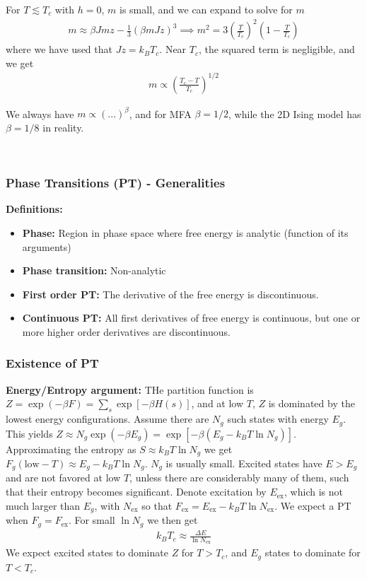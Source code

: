 \documentclass[a4paper, english, 12pt]{article}
\newcommand{\closed}[1]{\left( #1 \right)}
\begin{document}
\begin{multicols*}{2}
For $T\lesssim T_c$ with $h=0$, $m$ is small, and we can expand to solve for $m$
\begin{align*}
    m \approx \beta J m z - \frac{1}{3} (\beta m J z)^3 \implies m^2 = 3 \closed{\frac{T}{T_c}}^2 \closed{1-\frac{T}{T_c}} 
\end{align*}
where we have used that $Jz=k_B T_c$. Near $T_c$, the squared term is negligible, and we get 
\begin{align*}
    m \propto \closed{\frac{T_c-T}{T_c}}^{1/2}
\end{align*}

We always have $m\propto(...)^{\beta}$, and for MFA $\beta=1/2$, while the 2D Ising model has $\beta=1/8$ in reality. 

\


\subsubsection*{\scriptsize Phase Transitions (PT) - Generalities}
\textbf{Definitions:}
\begin{itemize}
    \item \textbf{Phase:} Region in phase space where free energy is analytic (function of its arguments)
    \item \textbf{Phase transition:} Non-analytic
    \item \textbf{First order PT:} The derivative of the free energy is discontinuous. 
    \item \textbf{Continuous PT:} All first derivatives of free energy is continuous, but one or more higher order derivatives are discontinuous. 
\end{itemize}

\subsubsection*{\tiny Existence of PT} 

\textbf{Energy/Entropy argument:} THe partition function is $Z=\exp(-\beta F)=\sum_s \exp[-\beta H(s)]$, and at low $T$, $Z$ is dominated by the lowest energy configurations. Assume there are $N_g$ such states with energy $E_g$. This yields $Z\approx N_g \exp(-\beta E_g)=\exp[-\beta(E_g - k_B T \ln N_g)]$. Approximating the entropy as $S\approx k_B T \ln N_g$ we get $F_g(\text{low}-T)\approx E_g - k_B T \ln N_g$. $N_g$ is usually small. Excited states have $E>E_g$ and are not favored at low $T$, unless there are considerably many of them, such that their entropy becomes significant. Denote excitation by $E_{\mathrm{ex}}$, which is not much larger than $E_g$, with $N_\mathrm{ex}$ so that $F_\mathrm{ex}=E_\mathrm{ex}-k_B T \ln N_\mathrm{ex}$. We expect a PT when $F_g=F_\mathrm{ex}$. For small $\ln N_g$ we then get 
\begin{align*}
    k_B T_c \approx \frac{\Delta E}{\ln N_\mathrm{ex}}
\end{align*} 
We expect excited states to dominate $Z$ for $T>T_c$, and $E_g$ states to dominate for $T<T_c$. 


\end{multicols*}
\end{document}
